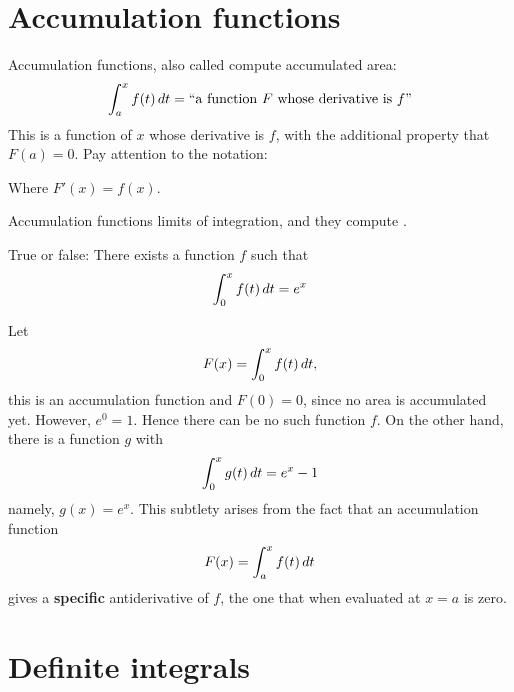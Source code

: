\documentclass{ximera}
\begin{document}
\section{Accumulation functions}

Accumulation functions, also called  compute accumulated area:
\[
\int_a^x f(t) \,d t = \text{``a function $F$ whose derivative is $f$''}
\]
This is a function of $x$ whose derivative is $f$, with the additional
property that $F(a)=0$.  Pay attention to the notation:
\begin{center}
\end{center}
Where $F'(x) = f(x)$.
\begin{explanation}%
  Accumulation functions  limits of integration, and they compute
  .
\end{explanation}
\begin{question}
  True or false: There exists a function $f$ such that 
  \[
  \int_0^x f(t) \,d t = e^x
  \]
  \begin{multipleChoice}
  \end{multipleChoice}
  \begin{feedback}
    Let
    \[
    F(x) = \int_0^x f(t) \,d t,
    \]
    this is an accumulation function and $F(0) = 0$, since no area is
    accumulated yet. However, $e^0 =1$. Hence there can be no such
    function $f$. On the other hand, there is a function $g$ with
     \[
     \int_0^x g(t) \,d t = e^x-1
     \]
     namely, $g(x) = e^x$. This subtlety arises from the fact that an
     accumulation function
     \[
     F(x) = \int_a^x f(t) \,d t
     \]
     gives a \textbf{specific} antiderivative of $f$, the one that
     when evaluated at $x=a$ is zero.
  \end{feedback}
\end{question}










\section{Definite integrals}
\end{document}
